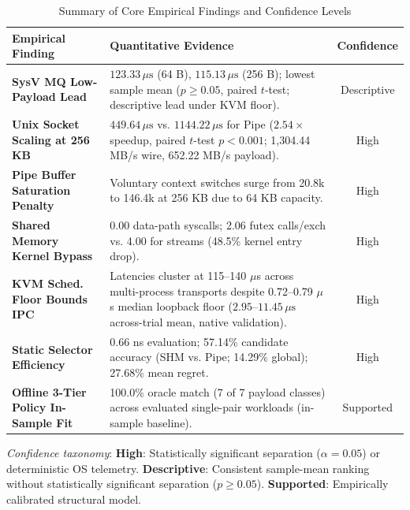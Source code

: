 \begin{table}[!t]
\centering
\caption{Summary of Core Empirical Findings and Confidence Levels}
\label{tab:summary_findings}
\scriptsize
\renewcommand{\arraystretch}{0.88}
\begin{tabular*}{\columnwidth}{@{\extracolsep{\fill}}p{2.6cm}p{3.8cm}c}
\toprule
\textbf{Empirical Finding} & \textbf{Quantitative Evidence} & \textbf{Confidence} \\
\midrule
\textbf{SysV MQ Low-Payload Lead} & $123.33\,\mu\text{s}$ (64 B), $115.13\,\mu\text{s}$ (256 B); lowest sample mean ($p \ge 0.05$, paired $t$-test; descriptive lead under KVM floor). & Descriptive \\
\addlinespace[0.4pt]
\textbf{Unix Socket Scaling at 256 KB} & $449.64\,\mu\text{s}$ vs. $1144.22\,\mu\text{s}$ for Pipe ($2.54\times$ speedup, paired $t$-test $p < 0.001$; 1,304.44 MB/s wire, 652.22 MB/s payload). & High \\
\addlinespace[0.4pt]
\textbf{Pipe Buffer Saturation Penalty} & Voluntary context switches surge from 20.8k to 146.4k at 256 KB due to 64 KB capacity. & High \\
\addlinespace[0.4pt]
\textbf{Shared Memory Kernel Bypass} & 0.00 data-path syscalls; 2.06 futex calls/exch vs. 4.00 for streams (48.5\% kernel entry drop). & High \\
\addlinespace[0.4pt]
\textbf{KVM Sched. Floor Bounds IPC} & Latencies cluster at 115--140 $\mu$s across multi-process transports despite 0.72--0.79 $\mu$s median loopback floor ($2.95\text{--}11.45\,\mu\text{s}$ across-trial mean, native validation). & High \\
\addlinespace[0.4pt]
\textbf{Static Selector Efficiency} & 0.66 ns evaluation; 57.14\% candidate accuracy (SHM vs. Pipe; 14.29\% global); 27.68\% mean regret. & High \\
\addlinespace[0.4pt]
\textbf{Offline 3-Tier Policy In-Sample Fit} & 100.0\% oracle match (7 of 7 payload classes) across evaluated single-pair workloads (in-sample baseline). & Supported \\
\bottomrule
\end{tabular*}
\vskip 1.5pt
{\scriptsize\noindent\emph{Confidence taxonomy}: \textbf{High}: Statistically significant separation ($\alpha = 0.05$) or deterministic OS telemetry. \textbf{Descriptive}: Consistent sample-mean ranking without statistically significant separation ($p \ge 0.05$). \textbf{Supported}: Empirically calibrated structural model.\par}
\end{table}
